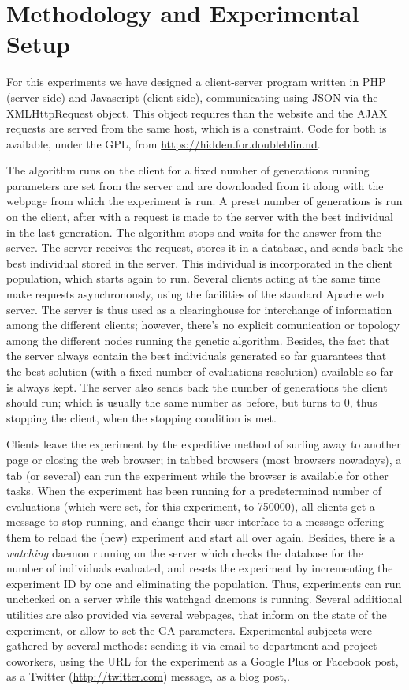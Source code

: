 \documentclass{llncs}
\begin{document}
\section{Methodology and Experimental Setup}
\label{sec:method}

For this experiments we have designed a client-server program written
in PHP (server-side) and Javascript (client-side), communicating
using JSON via the {\sf XMLHttpRequest} object. This object requires
than the website and the AJAX requests are served from the same host,
which is a constraint. Code for both is available, under the GPL, from
\url{https://hidden.for.doubleblin.nd}.

The algorithm runs on the client for a fixed number of generations
 running parameters are set from the server and are downloaded from
it along with the webpage from which the experiment is run. A preset
number of generations is run on the client, after with a request is
made to the server with the best individual in the last
generation. The algorithm stops and waits for the answer from the
server. The server receives the request, stores it in a database, and
sends back the best individual stored in the server. This individual
is incorporated in the client population, which starts again to run. 
Several clients acting at the same time make requests asynchronously,
using the facilities of the standard Apache web server. The server is
thus used as a clearinghouse for interchange of information among the
different clients; however, there's no explicit comunication or
topology among the different nodes running the genetic
algorithm. Besides, the fact that the server always contain the best
individuals generated so far guarantees that the best solution (with a
fixed number of evaluations resolution) available so far is always
kept. The server also sends back the number of generations the
client should run; which is usually the same number as before, but
turns to 0, thus stopping the client, when the stopping condition is
met. 

Clients leave the experiment by the expeditive method of surfing away
to another page or closing the web browser; in tabbed browsers (most
browsers nowadays), a tab (or several) can run the experiment while
the browser is available for other tasks. When the experiment has been
running for a predeterminad number of evaluations (which were set, for
this experiment, to 750000), all clients get a message to stop
running, and change their user interface to a message offering them to
reload the (new) experiment and start all over again. 
Besides, there is a {\em watching} daemon running on the server which
checks the database for the number of individuals evaluated, and
resets the experiment by incrementing the experiment ID by one and
eliminating the population. Thus, experiments can run unchecked on a
server while this {\sf watchgad} daemons is running. 
Several additional utilities are also provided via several webpages,
that inform on the state of the experiment, or allow to set the GA
parameters. 
Experimental subjects were gathered by several methods: sending it via
email to department and project coworkers, using the URL
for the experiment as a Google Plus or Facebook post, as a Twitter
(\url{http://twitter.com}) message, as a blog post,.
\end{document}
